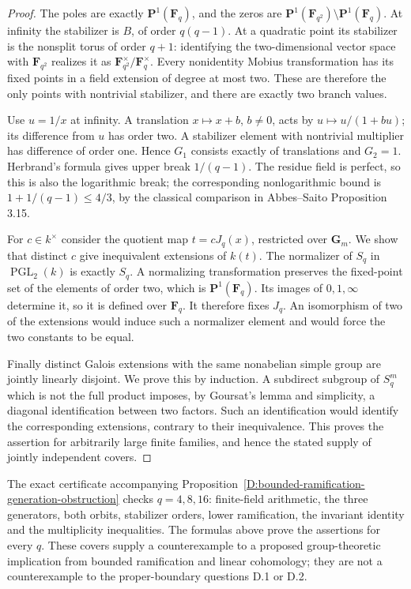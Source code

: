 \begin{proof}
The poles are exactly $\mathbf P^1(\mathbf F_q)$, and the zeros are
$\mathbf P^1(\mathbf F_{q^2})\setminus\mathbf P^1(\mathbf F_q)$.
At infinity the stabilizer is $B$, of order $q(q-1)$. At a quadratic
point its stabilizer is the nonsplit torus of order $q+1$: identifying
the two-dimensional vector space with $\mathbf F_{q^2}$ realizes it as
$\mathbf F_{q^2}^\times/\mathbf F_q^\times$. Every nonidentity Mobius
transformation has its fixed points in a field extension of degree at
most two. These are therefore the only points with nontrivial
stabilizer, and there are exactly two branch values.

Use $u=1/x$ at infinity. A translation $x\mapsto x+b$, $b\ne0$,
acts by $u\mapsto u/(1+bu)$; its difference from $u$ has order two.
A stabilizer element with nontrivial multiplier has difference of
order one. Hence $G_1$ consists exactly of translations and $G_2=1$.
Herbrand's formula gives upper break $1/(q-1)$. The residue field is
perfect, so this is also the logarithmic break; the corresponding
nonlogarithmic bound is $1+1/(q-1)\le4/3$, by the classical comparison
in Abbes--Saito Proposition 3.15.

For $c\in k^\times$ consider the quotient map $t=cJ_q(x)$, restricted
over $\mathbf G_m$. We show that distinct $c$ give inequivalent
extensions of $k(t)$. The normalizer of $S_q$ in
$\operatorname{PGL}_2(k)$ is exactly $S_q$. A normalizing transformation
preserves the fixed-point set of the elements of order two, which is
$\mathbf P^1(\mathbf F_q)$. Its images of $0,1,\infty$ determine it,
so it is defined over $\mathbf F_q$. It therefore fixes $J_q$.
An isomorphism of two of the extensions would induce such a normalizer
element and would force the two constants to be equal.

Finally distinct Galois extensions with the same nonabelian simple
group are jointly linearly disjoint. We prove this by induction.
A subdirect subgroup of $S_q^m$ which is not the full product imposes,
by Goursat's lemma and simplicity, a diagonal identification between
two factors. Such an identification would identify the corresponding
extensions, contrary to their inequivalence. This proves the assertion
for arbitrarily large finite families, and hence the stated supply of
jointly independent covers.
\end{proof}

\begin{remark}
The exact certificate accompanying
Proposition~\ref{D:bounded-ramification-generation-obstruction} checks
$q=4,8,16$: finite-field arithmetic, the three generators, both orbits,
stabilizer orders, lower ramification, the invariant identity and the
multiplicity inequalities. The formulas above prove the assertions
for every $q$. These covers supply a counterexample to a proposed
group-theoretic implication from bounded ramification and linear
cohomology; they are not a counterexample to the proper-boundary
questions D.1 or D.2.
\end{remark}
